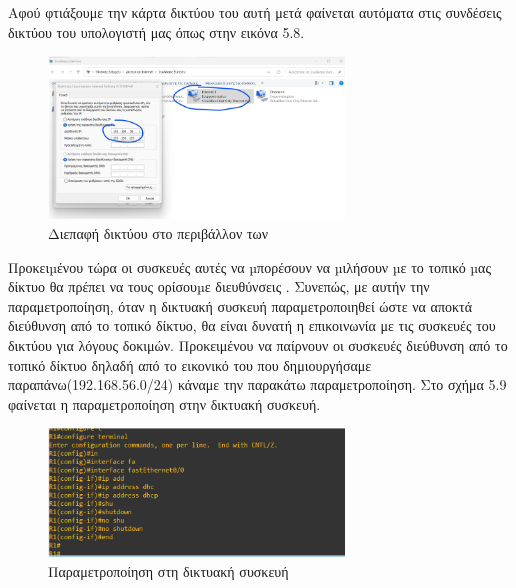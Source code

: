 \FloatBarrier


\noindent Αφού φτιάξουμε την κάρτα δικτύου του  αυτή μετά φαίνεται αυτόματα στις συνδέσεις δικτύου του υπολογιστή μας όπως στην εικόνα 5.8.

\FloatBarrier

\begin{figure}[htb]
	\centering
	\includegraphics[width=0.7\textwidth]{graphics/windows_host_networking.png}
	\caption{Διεπαφή δικτύου στο περιβάλλον των }
\end{figure}

\FloatBarrier

Προκειµένου τώρα οι συσκευές αυτές να µπορέσουν να µιλήσουν µε το τοπικό µας δίκτυο θα πρέπει να τους ορίσουµε  διευθύνσεις . Συνεπώς, με αυτήν την παραμετροποίηση, όταν η δικτυακή συσκευή παραμετροποιηθεί ώστε να αποκτά  διεύθυνση από το τοπικό δίκτυο, θα είναι δυνατή η επικοινωνία με τις συσκευές του δικτύου για λόγους δοκιμών.
Προκειμένου να παίρνουν οι συσκευές  διεύθυνση από το τοπικό δίκτυο δηλαδή από το εικονικό  του  που δημιουργήσαμε παραπάνω(192.168.56.0/24) κάναμε την παρακάτω παραμετροποίηση.
Στο σχήμα 5.9 φαίνεται η παραμετροποίηση στην δικτυακή συσκευή.

\FloatBarrier

\begin{figure}[htb]
	\centering
	\includegraphics[width=0.7\textwidth]{graphics/cisco_ssh_config_2.png}
	\caption{Παραμετροποίηση στη δικτυακή συσκευή}
\end{figure}


